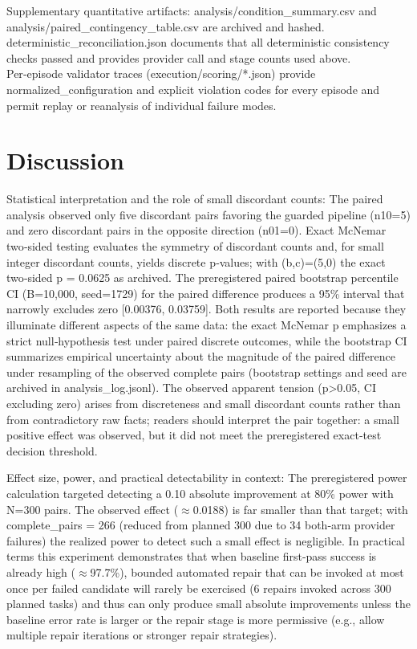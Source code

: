 \documentclass[conference]{IEEEtran}
\begin{document}
Supplementary quantitative artifacts: analysis/condition\_summary.csv and analysis/paired\_contingency\_table.csv are archived and hashed. deterministic\_reconciliation.json documents that all deterministic consistency checks passed and provides provider call and stage counts used above. Per‑episode validator traces (execution/scoring/*.json) provide normalized\_configuration and explicit violation codes for every episode and permit replay or reanalysis of individual failure modes.

\section{Discussion}
Statistical interpretation and the role of small discordant counts: The paired analysis observed only five discordant pairs favoring the guarded pipeline (n10=5) and zero discordant pairs in the opposite direction (n01=0). Exact McNemar two‑sided testing evaluates the symmetry of discordant counts and, for small integer discordant counts, yields discrete p‑values; with (b,c)=(5,0) the exact two‑sided p = 0.0625 as archived. The preregistered paired bootstrap percentile CI (B=10,000, seed=1729) for the paired difference produces a 95\% interval that narrowly excludes zero [0.00376, 0.03759]. Both results are reported because they illuminate different aspects of the same data: the exact McNemar p emphasizes a strict null‑hypothesis test under paired discrete outcomes, while the bootstrap CI summarizes empirical uncertainty about the magnitude of the paired difference under resampling of the observed complete pairs (bootstrap settings and seed are archived in analysis\_log.jsonl). The observed apparent tension (p>0.05, CI excluding zero) arises from discreteness and small discordant counts rather than from contradictory raw facts; readers should interpret the pair together: a small positive effect was observed, but it did not meet the preregistered exact‑test decision threshold.

Effect size, power, and practical detectability in context: The preregistered power calculation targeted detecting a 0.10 absolute improvement at 80\% power with N=300 pairs. The observed effect (\ensuremath{\approx}0.0188) is far smaller than that target; with complete\_pairs = 266 (reduced from planned 300 due to 34 both‑arm provider failures) the realized power to detect such a small effect is negligible. In practical terms this experiment demonstrates that when baseline first‑pass success is already high (\ensuremath{\approx}97.7\%), bounded automated repair that can be invoked at most once per failed candidate will rarely be exercised (6 repairs invoked across 300 planned tasks) and thus can only produce small absolute improvements unless the baseline error rate is larger or the repair stage is more permissive (e.g., allow multiple repair iterations or stronger repair strategies).
\end{document}
